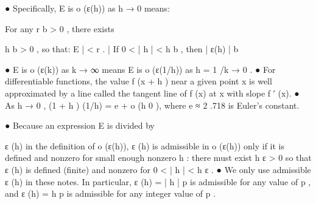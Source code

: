 ●
Specifically,  E    is  o (ε(h))  as  h → 0  means:  
 
For any  r b > 0 ,  there exists 
 
h b > 0 ,  so that:   
E | < r .  
|
 If  0 < | h | < h b ,  then  | ε(h)
| b
 
● E  is 
  o (ε(k))    as  k → ∞   means  E is 
  o (ε(1/h))  as  h = 1 /k → 0 .  
● For differentiable functions, the value  f (x + h )  near a given point  x is well  
approximated by a line called the tangent line of  f (x)  at  x with slope  f ′ (x).    
● As  h → 0 ,   (1 + h ) (1/h) = e + o (h 0 ),  where  e ≈ 2 .718  is Euler’s constant.
 
 
● Because an expression  E  is divided by 
 
ε (h) in the definition of  o (ε(h)),   ε (h)  is  
admissible in  o (ε(h))  only if it is defined and nonzero for small enough nonzero  
h :  there must exist  h ε > 0  so that  ε (h)  is defined (finite) and nonzero for  
0 < | h | < h ε .     
●  We only use admissible   ε (h)  in these notes.  In particular,  ε (h) = | h | p  is  
admissible for any value of  p ,  and   ε (h) = h p  is admissible for any integer value of  
p .  
